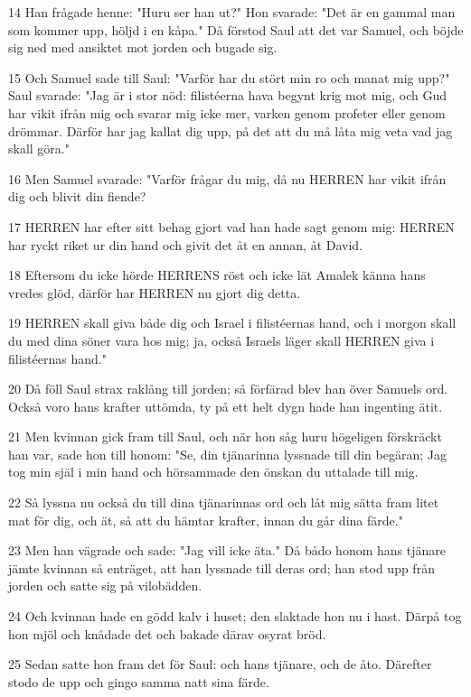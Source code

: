 \par 14 Han frågade henne: "Huru ser han ut?" Hon svarade: "Det är en gammal man som kommer upp, höljd i en kåpa." Då förstod Saul att det var Samuel, och böjde sig ned med ansiktet mot jorden och bugade sig.
\par 15 Och Samuel sade till Saul: "Varför har du stört min ro och manat mig upp?" Saul svarade: "Jag är i stor nöd: filistéerna hava begynt krig mot mig, och Gud har vikit ifrån mig och svarar mig icke mer, varken genom profeter eller genom drömmar. Därför har jag kallat dig upp, på det att du må låta mig veta vad jag skall göra."
\par 16 Men Samuel svarade: "Varför frågar du mig, då nu HERREN har vikit ifrån dig och blivit din fiende?
\par 17 HERREN har efter sitt behag gjort vad han hade sagt genom mig: HERREN har ryckt riket ur din hand och givit det åt en annan, åt David.
\par 18 Eftersom du icke hörde HERRENS röst och icke lät Amalek känna hans vredes glöd, därför har HERREN nu gjort dig detta.
\par 19 HERREN skall giva både dig och Israel i filistéernas hand, och i morgon skall du med dina söner vara hos mig; ja, också Israels läger skall HERREN giva i filistéernas hand."
\par 20 Då föll Saul strax raklång till jorden; så förfärad blev han över Samuels ord. Också voro hans krafter uttömda, ty på ett helt dygn hade han ingenting ätit.
\par 21 Men kvinnan gick fram till Saul, och när hon såg huru högeligen förskräckt han var, sade hon till honom: "Se, din tjänarinna lyssnade till din begäran; Jag tog min själ i min hand och hörsammade den önskan du uttalade till mig.
\par 22 Så lyssna nu också du till dina tjänarinnas ord och låt mig sätta fram litet mat för dig, och ät, så att du hämtar krafter, innan du går dina färde."
\par 23 Men han vägrade och sade: "Jag vill icke äta." Då bådo honom hans tjänare jämte kvinnan så enträget, att han lyssnade till deras ord; han stod upp från jorden och satte sig på vilobädden.
\par 24 Och kvinnan hade en gödd kalv i huset; den slaktade hon nu i hast. Därpå tog hon mjöl och knådade det och bakade därav osyrat bröd.
\par 25 Sedan satte hon fram det för Saul: och hans tjänare, och de åto. Därefter stodo de upp och gingo samma natt sina färde.

